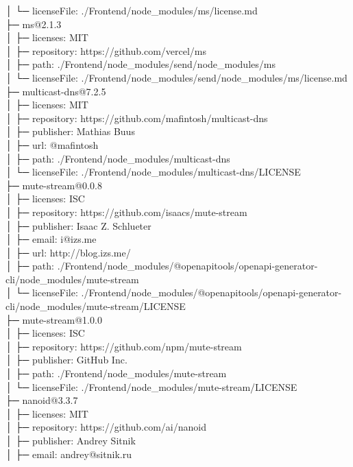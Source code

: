 │  └─ licenseFile: ./Frontend/node\_modules/ms/license.md\\
├─ ms@2.1.3\\
│  ├─ licenses: MIT\\
│  ├─ repository: https://github.com/vercel/ms\\
│  ├─ path: ./Frontend/node\_modules/send/node\_modules/ms\\
│  └─ licenseFile: ./Frontend/node\_modules/send/node\_modules/ms/license.md\\
├─ multicast-dns@7.2.5\\
│  ├─ licenses: MIT\\
│  ├─ repository: https://github.com/mafintosh/multicast-dns\\
│  ├─ publisher: Mathias Buus\\
│  ├─ url: @mafintosh\\
│  ├─ path: ./Frontend/node\_modules/multicast-dns\\
│  └─ licenseFile: ./Frontend/node\_modules/multicast-dns/LICENSE\\
├─ mute-stream@0.0.8\\
│  ├─ licenses: ISC\\
│  ├─ repository: https://github.com/isaacs/mute-stream\\
│  ├─ publisher: Isaac Z. Schlueter\\
│  ├─ email: i@izs.me\\
│  ├─ url: http://blog.izs.me/\\
│  ├─ path: ./Frontend/node\_modules/@openapitools/openapi-generator-cli/node\_modules/mute-stream\\
│  └─ licenseFile: ./Frontend/node\_modules/@openapitools/openapi-generator-cli/node\_modules/mute-stream/LICENSE\\
├─ mute-stream@1.0.0\\
│  ├─ licenses: ISC\\
│  ├─ repository: https://github.com/npm/mute-stream\\
│  ├─ publisher: GitHub Inc.\\
│  ├─ path: ./Frontend/node\_modules/mute-stream\\
│  └─ licenseFile: ./Frontend/node\_modules/mute-stream/LICENSE\\
├─ nanoid@3.3.7\\
│  ├─ licenses: MIT\\
│  ├─ repository: https://github.com/ai/nanoid\\
│  ├─ publisher: Andrey Sitnik\\
│  ├─ email: andrey@sitnik.ru\\

